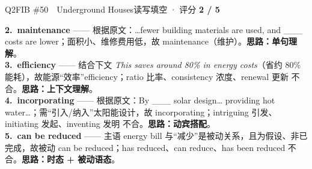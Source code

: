 \begin{qblock}{Q2\quad FIB \#50\ \ Underground Houses}{读写填空 · 评分 \textcolor{cAccent}{\bfseries 2 / 5}}
\begin{notebox}
\textbf{2.\ maintenance} —— 根据原文：…fewer building materials are used, and \_\_\_ costs are lower；面积小、维修费用低，故 maintenance（维护）。\textbf{思路：单句理解}。\\[2pt]
\textbf{3.\ efficiency} —— 结合下文 \emph{This saves around 80\% in energy costs}（省约 80\% 能耗），故能源“效率”efficiency；ratio 比率、consistency 浓度、renewal 更新 不合。\textbf{思路：上下文理解}。\\[2pt]
\textbf{4.\ incorporating} —— 根据原文：By \_\_\_ solar design… providing hot water…；需“引入/纳入”太阳能设计，故 incorporating；intriguing 引发、initiating 发起、inventing 发明 不合。\textbf{思路：动宾搭配}。\\[2pt]
\textbf{5.\ can be reduced} —— 主语 energy bill 与“减少”是被动关系，且为假设、非已完成，故被动 can be reduced；has reduced、can reduce、has been reduced 不合。\textbf{思路：时态 + 被动语态}。
\end{notebox}
\end{qblock}

